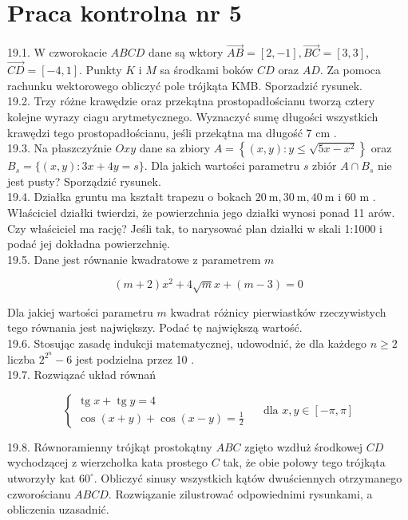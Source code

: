 \documentclass[10pt]{article}
\begin{document}
\section*{Praca kontrolna nr 5}
19.1. W czworokacie $A B C D$ dane są wktory $\overrightarrow{A B}=[2,-1], \overrightarrow{B C}=[3,3]$, $\overrightarrow{C D}=[-4,1]$. Punkty $K$ i $M$ sa środkami boków $C D$ oraz $A D$. Za pomoca rachunku wektorowego obliczyć pole trójkąta KMB. Sporzadzić rysunek.\\
19.2. Trzy różne krawędzie oraz przekątna prostopadłościanu tworzą cztery kolejne wyrazy ciagu arytmetycznego. Wyznaczyć sumę długości wszystkich krawędzi tego prostopadłościanu, jeśli przekątna ma długość 7 cm .\\
19.3. Na płaszczyźnie $O x y$ dane sa zbiory $A=\left\{(x, y): y \leq \sqrt{5 x-x^{2}}\right\}$ oraz $B_{s}=\{(x, y): 3 x+4 y=s\}$. Dla jakich wartości parametru $s$ zbiór $A \cap B_{s}$ nie jest pusty? Sporządzić rysunek.\\
19.4. Działka gruntu ma kształt trapezu o bokach $20 \mathrm{~m}, 30 \mathrm{~m}, 40 \mathrm{~m}$ i 60 m . Właściciel działki twierdzi, że powierzchnia jego działki wynosi ponad 11 arów. Czy właściciel ma rację? Jeśli tak, to narysować plan działki w skali 1:1000 i podać jej dokładna powierzchnię.\\
19.5. Dane jest równanie kwadratowe z parametrem $m$

$$
(m+2) x^{2}+4 \sqrt{m} x+(m-3)=0
$$

Dla jakiej wartości parametru $m$ kwadrat różnicy pierwiastków rzeczywistych tego równania jest największy. Podać tẹ największą wartość.\\
19.6. Stosując zasadę indukcji matematycznej, udowodnić, że dla każdego $n \geq 2$ liczba $2^{2^{n}}-6$ jest podzielna przez 10 .\\
19.7. Rozwiązać układ równań

$$
\left\{\begin{array}{l}
\operatorname{tg} x+\operatorname{tg} y=4 \\
\cos (x+y)+\cos (x-y)=\frac{1}{2}
\end{array} \quad \text { dla } x, y \in[-\pi, \pi]\right.
$$

19.8. Równoramienny trójkąt prostokątny $A B C$ zgięto wzdłuż środkowej $C D$ wychodzącej z wierzchołka kata prostego $C$ tak, że obie połowy tego trójkąta utworzyły kat $60^{\circ}$. Obliczyć sinusy wszystkich kątów dwuściennych otrzymanego czworościanu $A B C D$. Rozwiązanie zilustrować odpowiednimi rysunkami, a obliczenia uzasadnić.
\end{document}
